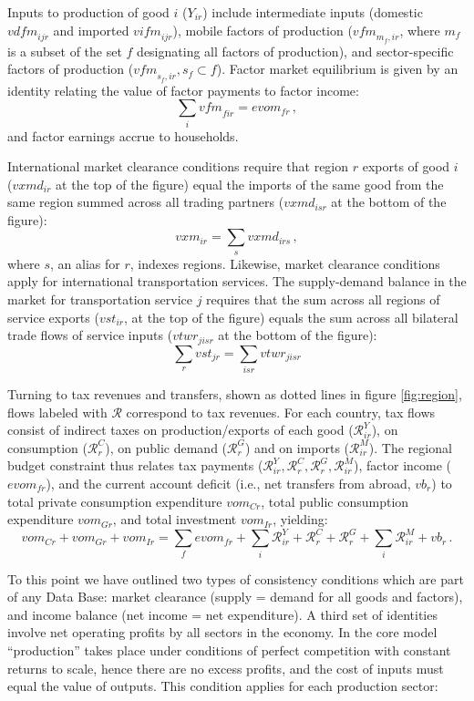 Inputs to production of good $i$ ($Y_{ir}$) include intermediate
inputs (domestic $\textit{vdfm}_{ijr}$ and imported
$\textit{vifm}_{ijr}$), mobile factors of production
($\textit{vfm}_{m_{f},ir}$, where $m_{f}$ is a subset of the set $f$
designating all factors of production), and sector-specific factors of
production ($\textit{vfm}_{s_{f},ir}, s_f \subset f$). Factor market
equilibrium is given by an identity relating the value of factor
payments to factor income:
$$\sum_i \textit{vfm}_{fir} = \textit{evom}_{fr}\,,$$ and factor
earnings accrue to households.

International market clearance conditions require that region $r$
exports of good $i$ ($\textit{vxmd}_{ir}$ at the top of the figure)
equal the imports of the same good from the same region summed across
all trading partners ($\textit{vxmd}_{isr}$ at the bottom of the
figure): $$\textit{vxm}_{ir} = \sum_s \textit{vxmd}_{irs}\,,$$ where
$s$, an alias for $r$, indexes regions. Likewise, market clearance
conditions apply for international transportation services. The
supply-demand balance in the market for transportation service $j$
requires that the sum across all regions of service exports
($\textit{vst}_{ir}$, at the top of the figure) equals the sum across
all bilateral trade flows of service inputs ($\textit{vtwr}_{jisr}$ at
the bottom of the figure):
$$\sum_r \textit{vst}_{jr} = \sum_{isr} \textit{vtwr}_{jisr}$$

Turning to tax revenues and transfers, shown as dotted lines in figure
\ref{fig:region}, flows labeled with $\mathcal{R}$ correspond to tax
revenues. For each country, tax flows consist of indirect taxes on
production/exports of each good ($\mathcal{R}^Y_{ir}$), on consumption
($\mathcal{R}^C_r$), on public demand ($\mathcal{R}^G_r$) and on
imports ($\mathcal{R}^M_{ir}$). The regional budget constraint thus
relates tax payments ($\mathcal{R}^Y_{ir}, \mathcal{R}^C_r,
\mathcal{R}^G_r, \mathcal{R}^M_{ir}$), factor income
($\textit{evom}_{fr}$), and the current account deficit (i.e., net
transfers from abroad, $\textit{vb}_r$) to total private consumption
expenditure $\textit{vom}_{Cr}$, total public consumption expenditure
$\textit{vom}_{Gr}$, and total investment $\textit{vom}_{Ir}$,
yielding:
$$\textit{vom}_{Cr} + \textit{vom}_{Gr} + \textit{vom}_{Ir} = \sum_f
\textit{evom}_{fr} + \sum_i \mathcal{R}^Y_{ir} + \mathcal{R}^C_r +
\mathcal{R}^G_r + \sum_i \mathcal{R}^M_{ir} + \textit{vb}_r\,. $$

To this point we have outlined two types of consistency conditions
which are part of any \GTAP Data Base: market clearance (supply = demand
for all goods and factors), and income balance (net income = net
expenditure). A third set of identities involve net operating profits
by all sectors in the economy. In the core \GTAP model ``production''
takes place under conditions of perfect competition with constant
returns to scale, hence there are no excess profits, and the cost of
inputs must equal the value of outputs. This condition applies for
each production sector:

